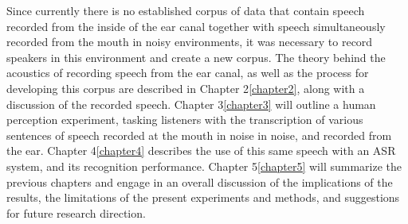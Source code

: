 \documentclass[dissertation,copyright]{uathesis}
\begin{document}
Since currently there is no established corpus of data that contain speech recorded from the inside of the ear canal together with speech simultaneously recorded from the mouth in noisy environments, it was necessary to record speakers in this environment and create a new corpus.  The theory behind the acoustics of recording speech from the ear canal, as well as the process for developing this corpus are described in Chapter 2\ref{chapter2}, along with a discussion of the recorded speech.  Chapter 3\ref{chapter3} will outline a human perception experiment, tasking listeners with the transcription of various sentences of speech recorded at the mouth in noise in noise, and recorded from the ear.   Chapter 4\ref{chapter4} describes the use of this same speech with an ASR system, and its recognition performance.  Chapter 5\ref{chapter5} will summarize the previous chapters and engage in an overall discussion of the implications of the results, the limitations of the present experiments and methods, and suggestions for future research direction.




\end{document}
